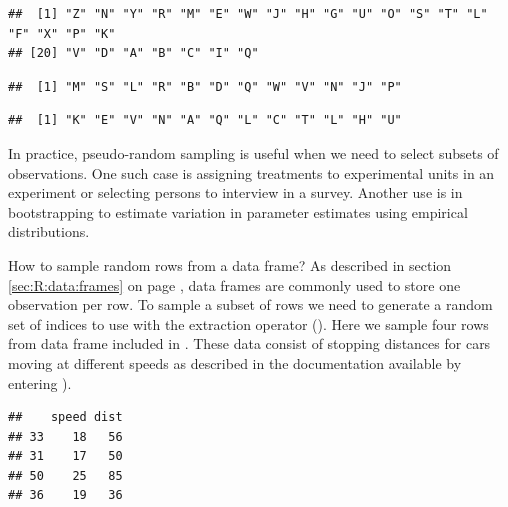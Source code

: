 \documentclass[krantz2]{krantz}\usepackage{knitr}
\begin{document}
\begin{knitrout}\footnotesize
{}\color{fgcolor}\begin{kframe}
\begin{alltt}
\hlstd{(} 
\end{alltt}
\begin{verbatim}
##  [1] "Z" "N" "Y" "R" "M" "E" "W" "J" "H" "G" "U" "O" "S" "T" "L" "F" "X" "P" "K"
## [20] "V" "D" "A" "B" "C" "I" "Q"
\end{verbatim}
\begin{alltt}
\hlstd{(}   \hlstd{=} \hlstd{)}
\end{alltt}
\begin{verbatim}
##  [1] "M" "S" "L" "R" "B" "D" "Q" "W" "V" "N" "J" "P"
\end{verbatim}
\begin{alltt}
\hlstd{(}   \hlstd{=} \hlstd{,}  \hlstd{=} \hlstd{)}
\end{alltt}
\begin{verbatim}
##  [1] "K" "E" "V" "N" "A" "Q" "L" "C" "T" "L" "H" "U"
\end{verbatim}
\end{kframe}
\end{knitrout}

In practice, pseudo-random sampling is useful when we need to select subsets of observations. One such case is assigning treatments to experimental units in an experiment or selecting persons to interview in a survey. Another use is in bootstrapping to estimate variation in parameter estimates using empirical distributions.

\begin{faqbox}{How to sample random rows from a data frame?}
As described in section \ref{sec:R:data:frames} on page \pageref{sec:R:data:frames}, data frames are commonly used to store one observation per row. To sample a subset of rows we need to generate a random set of indices to use with the extraction operator (\Roperator{[ ]}). Here we sample four rows from data frame  included in \Rlang. These data consist of stopping distances for cars moving at different speeds as described in the documentation available by entering ).

\begin{knitrout}\footnotesize
{}\color{fgcolor}\begin{kframe}
\begin{alltt}
\hlstd{cars[}\hlstd{(} \hlstd{=} \hlopt{:}  \hlstd{=} \hlstd{), ]}
\end{alltt}
\begin{verbatim}
##    speed dist
## 33    18   56
## 31    17   50
## 50    25   85
## 36    19   36
\end{verbatim}
\end{kframe}
\end{knitrout}

\end{faqbox}
\end{document}

